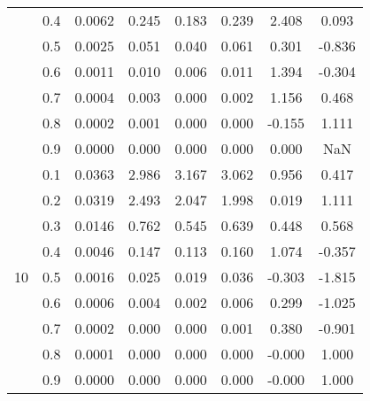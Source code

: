 \documentclass[11pt,a4paper]{report}
\begin{document}
\begin{longtable}{ | c | c || c | c | c | c | c | c | }
 & 0.4 & 0.0062 & 0.245 & 0.183 & 0.239 & 2.408 & 0.093 \\
 & 0.5 & 0.0025 & 0.051 & 0.040 & 0.061 & 0.301 & -0.836 \\
 & 0.6 & 0.0011 & 0.010 & 0.006 & 0.011 & 1.394 & -0.304 \\
 & 0.7 & 0.0004 & 0.003 & 0.000 & 0.002 & 1.156 & 0.468 \\
 & 0.8 & 0.0002 & 0.001 & 0.000 & 0.000 & -0.155 & 1.111 \\
 & 0.9 & 0.0000 & 0.000 & 0.000 & 0.000 & 0.000 & NaN \\
 \hline
\multirow{9}{*}{10} & 0.1 & 0.0363 & 2.986 & 3.167 & 3.062 & 0.956 & 0.417 \\
 & 0.2 & 0.0319 & 2.493 & 2.047 & 1.998 & 0.019 & 1.111 \\
 & 0.3 & 0.0146 & 0.762 & 0.545 & 0.639 & 0.448 & 0.568 \\
 & 0.4 & 0.0046 & 0.147 & 0.113 & 0.160 & 1.074 & -0.357 \\
 & 0.5 & 0.0016 & 0.025 & 0.019 & 0.036 & -0.303 & -1.815 \\
 & 0.6 & 0.0006 & 0.004 & 0.002 & 0.006 & 0.299 & -1.025 \\
 & 0.7 & 0.0002 & 0.000 & 0.000 & 0.001 & 0.380 & -0.901 \\
 & 0.8 & 0.0001 & 0.000 & 0.000 & 0.000 & -0.000 & 1.000 \\
 & 0.9 & 0.0000 & 0.000 & 0.000 & 0.000 & -0.000 & 1.000 \\
 \hline
\hline
\end{longtable}
\end{document}
